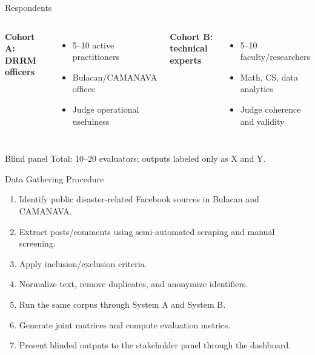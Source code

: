 \documentclass[aspectratio=169,10pt]{beamer}
\begin{document}
	
	\begin{frame}{Respondents}
		
		\begin{columns}[T]
			
			
			\textbf{Cohort A: DRRM officers}
			\begin{itemize}
				\item 5--10 active practitioners
				\item Bulacan/CAMANAVA offices
				\item Judge operational usefulness
			\end{itemize}
			
			
			\textbf{Cohort B: technical experts}
			\begin{itemize}
				\item 5--10 faculty/researchers
				\item Math, CS, data analytics
				\item Judge coherence and validity
			\end{itemize}
			
		\end{columns}
		
		\vspace{1mm}
		
		\begin{alertblock}{Blind panel}
			Total: 10--20 evaluators; outputs labeled only as X and Y.
		\end{alertblock}
		
	\end{frame}
	
	
	\begin{frame}{Data Gathering Procedure}
		
		\begin{enumerate}
			\item Identify public disaster-related Facebook sources in Bulacan and CAMANAVA.
			\item Extract posts/comments using semi-automated scraping and manual screening.
			\item Apply inclusion/exclusion criteria.
			\item Normalize text, remove duplicates, and anonymize identifiers.
			\item Run the same corpus through System A and System B.
			\item Generate joint matrices and compute evaluation metrics.
			\item Present blinded outputs to the stakeholder panel through the dashboard.
		\end{enumerate}
		
	\end{frame}
	
\end{document}
